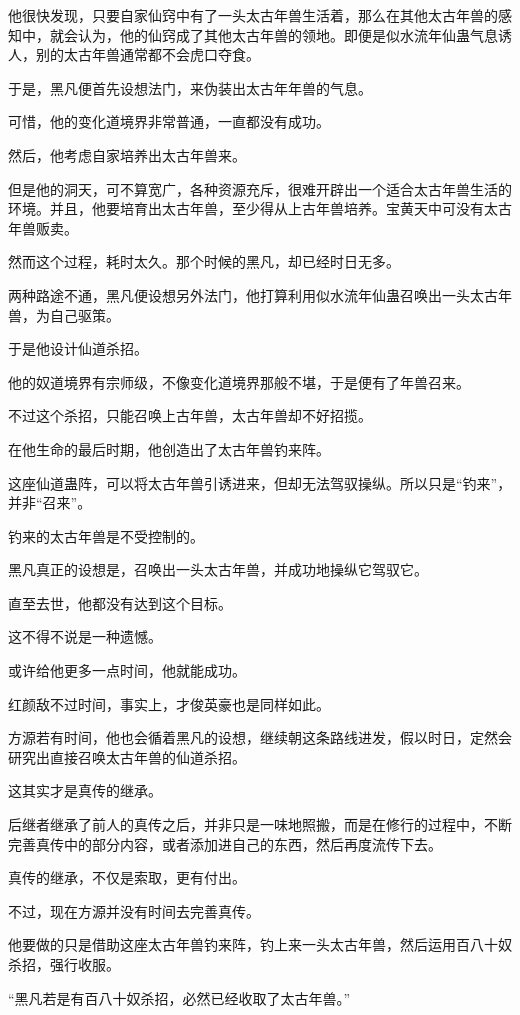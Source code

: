 \begin{this_body}
他很快发现，只要自家仙窍中有了一头太古年兽生活着，那么在其他太古年兽的感知中，就会认为，他的仙窍成了其他太古年兽的领地。即便是似水流年仙蛊气息诱人，别的太古年兽通常都不会虎口夺食。

于是，黑凡便首先设想法门，来伪装出太古年年兽的气息。

可惜，他的变化道境界非常普通，一直都没有成功。

然后，他考虑自家培养出太古年兽来。

但是他的洞天，可不算宽广，各种资源充斥，很难开辟出一个适合太古年兽生活的环境。并且，他要培育出太古年兽，至少得从上古年兽培养。宝黄天中可没有太古年兽贩卖。

然而这个过程，耗时太久。那个时候的黑凡，却已经时日无多。

两种路途不通，黑凡便设想另外法门，他打算利用似水流年仙蛊召唤出一头太古年兽，为自己驱策。

于是他设计仙道杀招。

他的奴道境界有宗师级，不像变化道境界那般不堪，于是便有了年兽召来。

不过这个杀招，只能召唤上古年兽，太古年兽却不好招揽。

在他生命的最后时期，他创造出了太古年兽钓来阵。

这座仙道蛊阵，可以将太古年兽引诱进来，但却无法驾驭操纵。所以只是“钓来”，并非“召来”。

钓来的太古年兽是不受控制的。

黑凡真正的设想是，召唤出一头太古年兽，并成功地操纵它驾驭它。

直至去世，他都没有达到这个目标。

这不得不说是一种遗憾。

或许给他更多一点时间，他就能成功。

红颜敌不过时间，事实上，才俊英豪也是同样如此。

方源若有时间，他也会循着黑凡的设想，继续朝这条路线进发，假以时日，定然会研究出直接召唤太古年兽的仙道杀招。

这其实才是真传的继承。

后继者继承了前人的真传之后，并非只是一味地照搬，而是在修行的过程中，不断完善真传中的部分内容，或者添加进自己的东西，然后再度流传下去。

真传的继承，不仅是索取，更有付出。

不过，现在方源并没有时间去完善真传。

他要做的只是借助这座太古年兽钓来阵，钓上来一头太古年兽，然后运用百八十奴杀招，强行收服。

“黑凡若是有百八十奴杀招，必然已经收取了太古年兽。”


\end{this_body}
